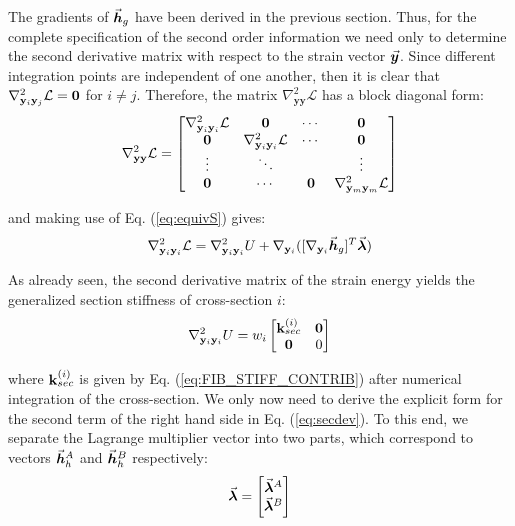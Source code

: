 \begin{appendices}
\noindent The gradients of $\vec{\bm{h}}_g$ have been derived in the previous
section.  Thus, for the complete specification of the second order information
we need only to determine the second derivative matrix with respect to the
strain vector $\vec{\bm{y}}$. Since different integration points are independent of
one another, then it is clear
that $\nabla^2_{\mathbf{y}_i\mathbf{y}_j}\mathcal{L}=\mathbf{0}$ for $i\neq j$.
Therefore, the matrix $\nabla^2_{\mathbf{yy}}\mathcal{L}$ has a block diagonal
form:
\begin{gather}
	\nabla^2_{\mathbf{yy}}\mathcal{L} = \begin{bmatrix}
		\nabla^2_{\mathbf{y}_i\mathbf{y}_i}\mathcal{L} &\mathbf{0} &\cdots & 
		\mathbf{0} \\
		\mathbf{0} & \nabla^2_{\mathbf{y}_i\mathbf{y}_i}\mathcal{L} &\cdots 
		&\mathbf{0} \\
		\vdots & \ddots & &\vdots \\
		\mathbf{0} & \cdots &\mathbf{0} & 
		\nabla^2_{\mathbf{y}_m\mathbf{y}_m}\mathcal{L}
	\end{bmatrix}\nonumber
\end{gather}

\noindent and making use of Eq. (\ref{eq:equivS}) gives:
\begin{gather}
	\nabla^2_{\mathbf{y}_i\mathbf{y}_i}\mathcal{L} =
	\nabla^2_{\mathbf{y}_i\mathbf{y}_i}U
	+ \nabla_{\mathbf{y}_i}([\nabla_{\mathbf{y}_i}\vec{\bm{h}}_g]^T\vec{\bm{\lambda}})
	\label{eq:secdev}
\end{gather}

\noindent As already seen, the second derivative matrix of the strain
energy yields the generalized section stiffness of cross-section $i$:
\begin{gather}
	\nabla^2_{\mathbf{y}_i\mathbf{y}_i}U = w_i\begin{bmatrix}
		\mathbf{k}_{sec}^{(i)} & \mathbf{0}\\
		\mathbf{0} & 0
	\end{bmatrix}\nonumber
\end{gather}

\noindent where $\mathbf{k}_{sec}^{(i)}$ is given by Eq. 
(\ref{eq:FIB_STIFF_CONTRIB}) after
numerical integration of the cross-section. We only now need to derive
the explicit
form for the second term of the right hand side in Eq. (\ref{eq:secdev}). To 
this
end, we separate the Lagrange multiplier vector into two parts, which correspond
to vectors $\vec{\bm{h}}_h^A$ and $\vec{\bm{h}}_h^B$ respectively:
\begin{gather}
	\vec{\bm{\lambda}} = \begin{bmatrix}
		\vec{\bm{\lambda}}^A\\ \vec{\bm{\lambda}}^B
	\end{bmatrix}\nonumber
\end{gather}


\end{appendices}
